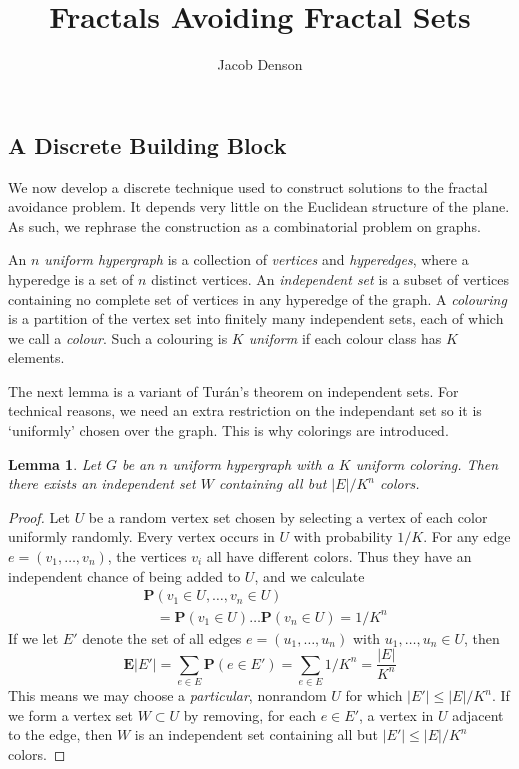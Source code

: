 \documentclass{article}
\title{Fractals Avoiding Fractal Sets}
\author{Jacob Denson}
\theoremstyle{plain}
\newtheorem{lemma}{Lemma}
\theoremstyle{plain}
\begin{document}
\maketitle

\begin{multicols}{2}

\section{A Discrete Building Block}

We now develop a discrete technique used to construct solutions to the fractal avoidance problem. It depends very little on the Euclidean structure of the plane. As such, we rephrase the construction as a combinatorial problem on graphs.

An {\it $n$ uniform hypergraph} is a collection of {\it vertices} and {\it hyperedges}, where a hyperedge is a set of $n$ distinct vertices. An {\it independent set} is a subset of vertices containing no complete set of vertices in any hyperedge of the graph. A {\it colouring} is a partition of the vertex set into finitely many independent sets, each of which we call a {\it colour}. Such a colouring is {\it $K$ uniform} if each colour class has $K$ elements.

The next lemma is a variant of Tur\'{a}n's theorem on independent sets. For technical reasons, we need an extra restriction on the independant set so it is `uniformly' chosen over the graph. This is why colorings are introduced.

\begin{lemma}
	Let $G$ be an $n$ uniform hypergraph  with a $K$ uniform coloring. Then there exists an independent set $W$ containing all but $|E|/K^n$ colors.
\end{lemma}
\begin{proof}
	Let $U$ be a random vertex set chosen by selecting a vertex of each color uniformly randomly. Every vertex occurs in $U$ with probability $1/K$. For any edge $e = (v_1, \dots, v_n)$, the vertices $v_i$ all have different colors. Thus they have an independent chance of being added to $U$, and we calculate
	\begin{align*}
		&\mathbf{P}(v_1 \in U, \dots, v_n \in U)\\
		&\ \ \ \ = \mathbf{P}(v_1 \in U) \dots \mathbf{P}(v_n \in U) = 1/K^n
	\end{align*}
	If we let $E'$ denote the set of all edges $e = (u_1, \dots, u_n)$ with $u_1, \dots, u_n \in U$, then
	\[ \mathbf{E}|E'| = \sum_{e \in E} \mathbf{P}(e \in E') = \sum_{e \in E} 1/K^n = \frac{|E|}{K^n} \]
	This means we may choose a {\it particular}, nonrandom $U$ for which $|E'| \leq |E|/K^n$. If we form a vertex set $W \subset U$ by removing, for each $e \in E'$, a vertex in $U$ adjacent to the edge, then $W$ is an independent set containing all but $|E'| \leq |E|/K^n$ colors.
\end{proof}


\end{multicols}
\end{document}
